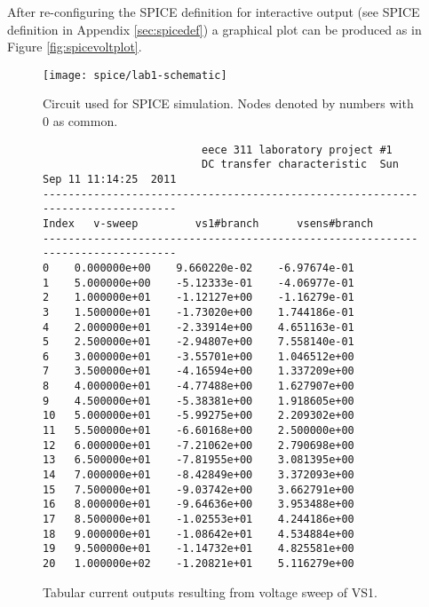 \documentclass{article}
\begin{document}
After re-configuring the SPICE definition for interactive output
(see SPICE definition in Appendix \ref{sec:spicedef}) a graphical plot
can be produced as in Figure \ref{fig:spicevoltplot}.

\begin{figure}[!hbtp]
\center
\texttt{[image: spice/lab1-schematic]}
\caption{Circuit used for SPICE simulation.
Nodes denoted by numbers with 0 as common.}
\label{fig:circuit}
\end{figure}


\begin{figure}
{\footnotesize
\begin{verbatim}
                         eece 311 laboratory project #1
                         DC transfer characteristic  Sun Sep 11 11:14:25  2011
--------------------------------------------------------------------------------
Index   v-sweep         vs1#branch      vsens#branch    
--------------------------------------------------------------------------------
0    0.000000e+00    9.660220e-02    -6.97674e-01    
1    5.000000e+00    -5.12333e-01    -4.06977e-01    
2    1.000000e+01    -1.12127e+00    -1.16279e-01    
3    1.500000e+01    -1.73020e+00    1.744186e-01    
4    2.000000e+01    -2.33914e+00    4.651163e-01    
5    2.500000e+01    -2.94807e+00    7.558140e-01    
6    3.000000e+01    -3.55701e+00    1.046512e+00    
7    3.500000e+01    -4.16594e+00    1.337209e+00    
8    4.000000e+01    -4.77488e+00    1.627907e+00    
9    4.500000e+01    -5.38381e+00    1.918605e+00    
10   5.000000e+01    -5.99275e+00    2.209302e+00    
11   5.500000e+01    -6.60168e+00    2.500000e+00    
12   6.000000e+01    -7.21062e+00    2.790698e+00    
13   6.500000e+01    -7.81955e+00    3.081395e+00    
14   7.000000e+01    -8.42849e+00    3.372093e+00    
15   7.500000e+01    -9.03742e+00    3.662791e+00    
16   8.000000e+01    -9.64636e+00    3.953488e+00    
17   8.500000e+01    -1.02553e+01    4.244186e+00    
18   9.000000e+01    -1.08642e+01    4.534884e+00    
19   9.500000e+01    -1.14732e+01    4.825581e+00    
20   1.000000e+02    -1.20821e+01    5.116279e+00    
\end{verbatim}
}
\caption{Tabular current outputs resulting from voltage sweep of VS1.}
\label{fig:spicecur}
\end{figure}
\end{document}
